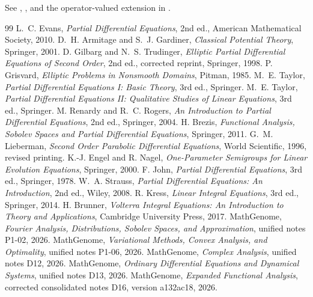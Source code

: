 \documentclass[11pt,oneside,openany]{book}
\theoremstyle{plain}
\theoremstyle{definition}
\theoremstyle{remark}
\begin{document}
See \cite[Section 3.3, Theorem 3.10]{Kress},
\cite[Section 1.2, Lemma 1.2.1 and Theorem 1.2.3]{Brunner}, and
the operator-valued extension in \cite{D16}.

\backmatter
\begingroup
\small
\begin{thebibliography}{99}
 L.~C. Evans, \emph{Partial Differential Equations}, 2nd ed.,
American Mathematical Society, 2010.
 D.~H. Armitage and S.~J. Gardiner, \emph{Classical Potential
Theory}, Springer, 2001.
 D. Gilbarg and N.~S. Trudinger, \emph{Elliptic Partial
Differential Equations of Second Order}, 2nd ed., corrected reprint, Springer, 1998.
 P. Grisvard, \emph{Elliptic Problems in Nonsmooth
Domains}, Pitman, 1985.
 M.~E. Taylor, \emph{Partial Differential Equations I:
Basic Theory}, 3rd ed., Springer.
 M.~E. Taylor, \emph{Partial Differential Equations II:
Qualitative Studies of Linear Equations}, 3rd ed., Springer.
 M. Renardy and R.~C. Rogers, \emph{An Introduction to Partial
Differential Equations}, 2nd ed., Springer, 2004.
 H. Brezis, \emph{Functional Analysis, Sobolev Spaces and
Partial Differential Equations}, Springer, 2011.
 G.~M. Lieberman, \emph{Second Order Parabolic
Differential Equations}, World Scientific, 1996, revised printing.
 K.-J. Engel and R. Nagel, \emph{One-Parameter
Semigroups for Linear Evolution Equations}, Springer, 2000.
 F. John, \emph{Partial Differential Equations}, 3rd ed.,
Springer, 1978.
 W.~A. Strauss, \emph{Partial Differential Equations:
An Introduction}, 2nd ed., Wiley, 2008.
 R. Kress, \emph{Linear Integral Equations}, 3rd ed.,
Springer, 2014.
 H. Brunner, \emph{Volterra Integral Equations:
An Introduction to Theory and Applications}, Cambridge University Press, 2017.
 MathGenome, \emph{Fourier Analysis, Distributions, Sobolev
Spaces, and Approximation}, unified notes P1-02, 2026.
 MathGenome, \emph{Variational Methods, Convex Analysis,
and Optimality}, unified notes P1-06, 2026.
 MathGenome, \emph{Complex Analysis}, unified notes D12, 2026.
 MathGenome, \emph{Ordinary Differential Equations and
Dynamical Systems}, unified notes D13, 2026.
 MathGenome, \emph{Expanded Functional Analysis}, corrected
consolidated notes D16, version a132ac18, 2026.
\end{thebibliography}
\endgroup
\end{document}
